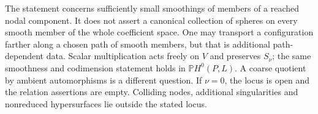 \begin{remark}
The statement concerns sufficiently small smoothings of members of a
reached nodal component. It does not assert a canonical collection of
spheres on every smooth member of the whole coefficient space.
One may transport a configuration farther along a chosen path of
smooth members, but that is additional path-dependent data.
Scalar multiplication acts freely on $V$ and preserves $S_\nu$;
the same smoothness and codimension statement holds in $\mathbb P H^0(P,L)$.
A coarse quotient by ambient automorphisms is a different question.
If $\nu=0$, the locus is open and the relation assertions are empty.
Colliding nodes, additional singularities and nonreduced hypersurfaces
lie outside the stated locus.
\end{remark}
